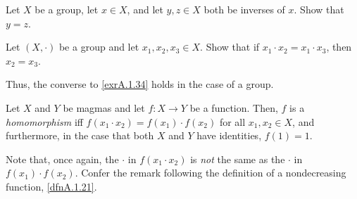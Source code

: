 \begin{exr}\label{exrA.1.79}
Let $X$ be a group, let $x\in X$, and let $y,z\in X$ both be inverses of $x$.  Show that $y=z$.
\end{exr}
\begin{exr}
Let $(X,\cdot )$ be a group and let $x_1,x_2,x_3\in X$.  Show that if $x_1\cdot x_2=x_1\cdot x_3$, then $x_2=x_3$.
\begin{rmk}
Thus, the converse to \cref{exrA.1.34} holds in the case of a group.
\end{rmk}
\end{exr}
\begin{dfn}
Let $X$ and $Y$ be magmas and let $f:X\rightarrow Y$ be a function.  Then, $f$ is a \emph{homomorphism} iff $f(x_1\cdot x_2)=f(x_1)\cdot f(x_2)$ for all $x_1,x_2\in X$, and furthermore, in the case that both $X$ and $Y$ have identities, $f(1)=1$.
\begin{rmk}
Note that, once again, the $\cdot$ in $f(x_1\cdot x_2)$ is \emph{not} the same as the $\cdot$ in $f(x_1)\cdot f(x_2)$.  Confer the remark following the definition of a nondecreasing function, \cref{dfnA.1.21}.
\end{rmk}
\end{dfn}

